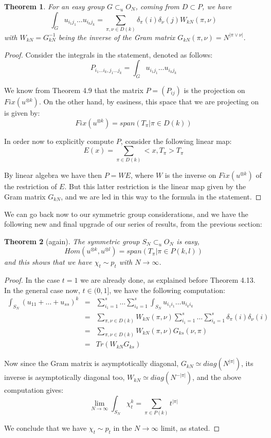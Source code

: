 \documentclass[12pt]{amsbook}
\newtheorem{theorem}{Theorem}[chapter]
\begin{document}

\begin{theorem}
For an easy group $G\subset_uO_N$, coming from $D\subset P$, we have
$$\int_Gu_{i_1j_1}\ldots u_{i_kj_k}=\sum_{\pi,\nu\in D(k)}\delta_\pi(i)\delta_\nu(j)W_{kN}(\pi,\nu)$$
with $W_{kN}=G_{kN}^{-1}$ being the inverse of the Gram matrix $G_{kN}(\pi,\nu)=N^{|\pi\vee\nu|}$.
\end{theorem}

\begin{proof}
Consider the integrals in the statement, denoted as follows:
$$P_{i_1\ldots i_k,j_1\ldots j_k}=\int_Gu_{i_1j_1}\ldots u_{i_kj_k}$$

We know from Theorem 4.9 that the matrix $P=(P_{ij})$ is the projection on $Fix(u^{\otimes k})$. On the other hand, by easiness, this space that we are projecting on is given by:
$$Fix(u^{\otimes k})=span\left(T_\pi\Big|\pi\in D(k)\right)$$

In order now to explicitly compute $P$, consider the following linear map:
$$E(x)=\sum_{\pi\in D(k)}<x,T_\pi>T_\pi$$

By linear algebra we have then $P=WE$, where $W$ is the inverse on $Fix(u^{\otimes k})$ of the restriction of $E$. But this latter restriction is the linear map given by the Gram matrix $G_{kN}$, and we are led in this way to the formula in the statement.
\end{proof}

We can go back now to our symmetric group considerations, and we have the following new and final upgrade of our series of results, from the previous section:

\begin{theorem}[again]
The symmetric group $S_N\subset_uO_N$ is easy,
$$Hom(u^{\otimes k},u^{\otimes l})=span\left(T_\pi\Big|\pi\in P(k,l)\right)$$
and this shows that we have $\chi_t\sim p_t$ with $N\to\infty$.
\end{theorem}

\begin{proof}
In the case $t=1$ we are already done, as explained before Theorem 4.13. In the general case now, $t\in(0,1]$, we have the following computation:
\begin{eqnarray*}
\int_{S_N}(u_{11}+\ldots +u_{ss})^k
&=&\sum_{i_1=1}^{s}\ldots\sum_{i_k=1}^s\int_{S_N}u_{i_1i_1}\ldots u_{i_ki_k}\\
&=&\sum_{\pi,\nu\in D(k)}W_{kN}(\pi,\nu)\sum_{i_1=1}^{s}\ldots\sum_{i_k=1}^s\delta_\pi(i)\delta_\nu(i)\\
&=&\sum_{\pi,\nu\in D(k)}W_{kN}(\pi,\nu)G_{ks}(\nu,\pi)\\
&=&Tr(W_{kN}G_{ks})
\end{eqnarray*}

Now since the Gram matrix is asymptotically diagonal, $G_{kN}\simeq diag(N^{|\pi|})$, its inverse is asymptotically diagonal too, $W_{kN}\simeq diag(N^{-|\pi|})$, and the above computation gives:
$$\lim_{N\to\infty}\int_{S_N}\chi_t^k=\sum_{\pi\in P(k)}t^{|\pi|}$$

We conclude that we have $\chi_t\sim p_t$ in the $N\to\infty$ limit, as stated.
\end{proof}
\end{document}
